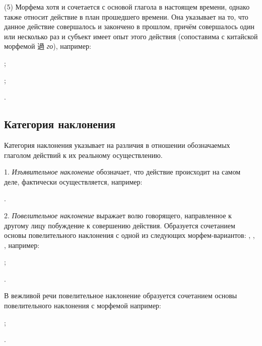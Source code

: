 (5) Морфема  хотя и сочетается с основой глагола в настоящем времени, однако также относит действие в план прошедшего времени. Она указывает на то, что данное действие совершалось и закончено в прошлом, причём совершалось один или несколько раз и субъект имеет опыт этого действия (сопоставима с китайской морфемой {\chinfont 過} \emph{го}), например:
\begin{prfsample}
	\item {};
	\item {};
	\item {}.
\end{prfsample}

\subsection{Категория наклонения}

Категория наклонения указывает на различия в отношении обозначаемых глаголом действий к их реальному осуществлению.

1. \emph{Изъявительное наклонение} обозначает, что действие происходит на самом деле, фактически осуществляется, например:
\begin{prfsample}
	\item {}.
\end{prfsample}

2. \emph{Повелительное наклонение} выражает волю говорящего, направленное к другому лицу побуждение к совершению действия. Образуется сочетанием основы повелительного наклонения с одной из следующих морфем-вариантов: , , , например:
\begin{prfsample}
	\item {};
	\item {}.
\end{prfsample}

В вежливой речи повелительное наклонение образуется сочетанием основы повелительного наклонения с морфемой  например:
\begin{prfsample}
	\item {};
	\item {}.
\end{prfsample}

